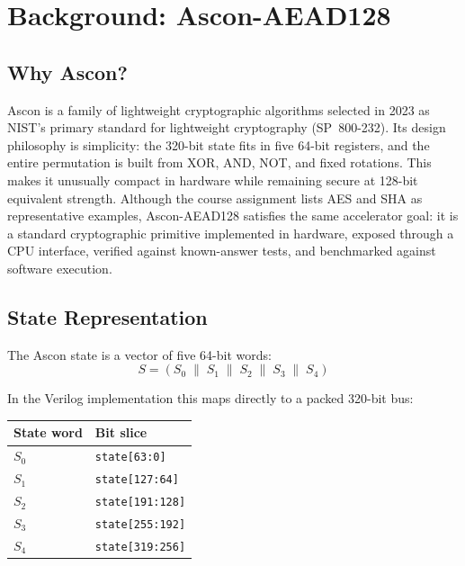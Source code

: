 \documentclass[11pt,a4paper]{article}
\begin{document}
\section{Background: Ascon-AEAD128}
\label{sec:background}

\subsection{Why Ascon?}

Ascon is a family of lightweight cryptographic algorithms selected in 2023 as
NIST's primary standard for lightweight cryptography (SP~800-232). Its design
philosophy is simplicity: the 320-bit state fits in five 64-bit registers, and
the entire permutation is built from XOR, AND, NOT, and fixed rotations. This
makes it unusually compact in hardware while remaining secure at 128-bit
equivalent strength. Although the course assignment lists AES and SHA as
representative examples, Ascon-AEAD128 satisfies the same accelerator goal: it
is a standard cryptographic primitive implemented in hardware, exposed through
a CPU interface, verified against known-answer tests, and benchmarked against
software execution.

\subsection{State Representation}

The Ascon state is a vector of five 64-bit words:
\[
  S = (S_0 \;\|\; S_1 \;\|\; S_2 \;\|\; S_3 \;\|\; S_4)
\]

In the Verilog implementation this maps directly to a packed 320-bit bus:

\begin{center}
\begin{tabular}{@{}ll@{}}
  \toprule
  \textbf{State word} & \textbf{Bit slice} \\
  \midrule
  $S_0$ & \texttt{state[63:0]}     \\
  $S_1$ & \texttt{state[127:64]}   \\
  $S_2$ & \texttt{state[191:128]}  \\
  $S_3$ & \texttt{state[255:192]}  \\
  $S_4$ & \texttt{state[319:256]}  \\
  \bottomrule
\end{tabular}
\end{center}
\end{document}
